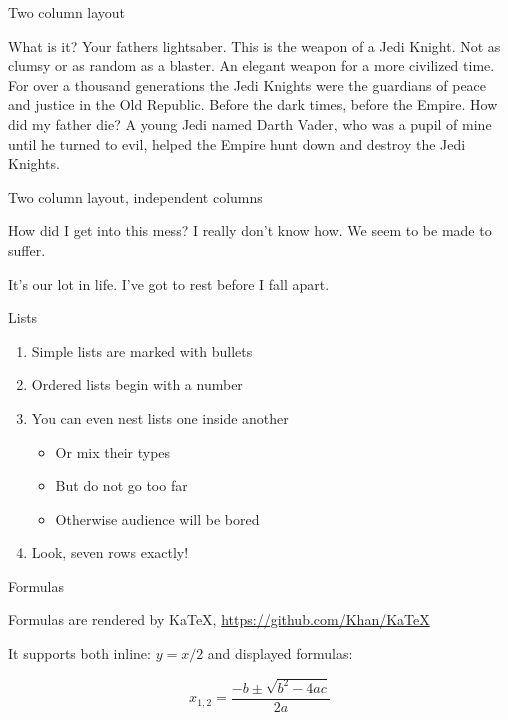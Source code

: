 \documentclass[ignorenonframetext,]{beamer}
\providecommand{\tightlist}{%
  \setlength{\itemsep}{0pt}\setlength{\parskip}{0pt}}
\begin{document}
\begin{frame}{Two column layout}
\protect\hypertarget{two-column-layout}{}

What is it? Your fathers lightsaber. This is the weapon of a Jedi
Knight. Not as clumsy or as random as a blaster. An elegant weapon for a
more civilized time. For over a thousand generations the Jedi Knights
were the guardians of peace and justice in the Old Republic. Before the
dark times, before the Empire. How did my father die? A young Jedi named
Darth Vader, who was a pupil of mine until he turned to evil, helped the
Empire hunt down and destroy the Jedi Knights.

\end{frame}

\begin{frame}{Two column layout, independent columns}
\protect\hypertarget{two-column-layout-independent-columns}{}

How did I get into this mess? I really don't know how. We seem to be
made to suffer.

It's our lot in life. I've got to rest before I fall apart.

\end{frame}

\begin{frame}{Lists}
\protect\hypertarget{lists}{}

\begin{enumerate}
\tightlist
\item
  Simple lists are marked with bullets
\item
  Ordered lists begin with a number
\item
  You can even nest lists one inside another

  \begin{itemize}
  \tightlist
  \item
    Or mix their types
  \item
    But do not go too far
  \item
    Otherwise audience will be bored
  \end{itemize}
\item
  Look, seven rows exactly!
\end{enumerate}

\end{frame}

\begin{frame}{Formulas}
\protect\hypertarget{formulas}{}

Formulas are rendered by KaTeX, \url{https://github.com/Khan/KaTeX}

It supports both inline: \(y = x / 2\) and displayed formulas:

\[ x_{1,2} = \frac{- b \pm \sqrt{b^2 - 4ac}}{2a} \]

\end{frame}
\end{document}
